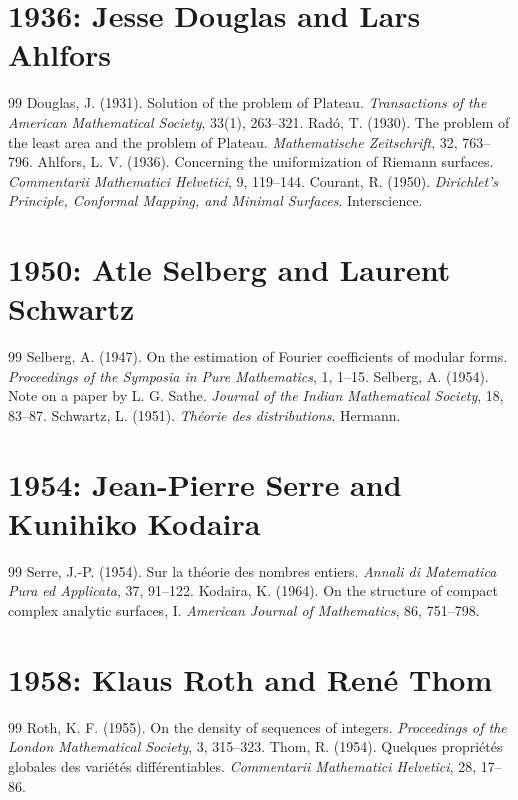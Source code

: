 \documentclass[12pt,a4paper]{book}
\theoremstyle{definition}
\theoremstyle{remark}
\begin{document}
\section*{1936: Jesse Douglas and Lars Ahlfors}
\begin{thebibliography}{99}
 Douglas, J. (1931). Solution of the problem of Plateau. \emph{Transactions of the American Mathematical Society}, 33(1), 263--321.
 Radó, T. (1930). The problem of the least area and the problem of Plateau. \emph{Mathematische Zeitschrift}, 32, 763--796.
 Ahlfors, L. V. (1936). Concerning the uniformization of Riemann surfaces. \emph{Commentarii Mathematici Helvetici}, 9, 119--144.
 Courant, R. (1950). \emph{Dirichlet's Principle, Conformal Mapping, and Minimal Surfaces}. Interscience.
\end{thebibliography}

\section*{1950: Atle Selberg and Laurent Schwartz}
\begin{thebibliography}{99}
 Selberg, A. (1947). On the estimation of Fourier coefficients of modular forms. \emph{Proceedings of the Symposia in Pure Mathematics}, 1, 1--15.
 Selberg, A. (1954). Note on a paper by L. G. Sathe. \emph{Journal of the Indian Mathematical Society}, 18, 83--87.
 Schwartz, L. (1951). \emph{Théorie des distributions}. Hermann.
\end{thebibliography}

\section*{1954: Jean-Pierre Serre and Kunihiko Kodaira}
\begin{thebibliography}{99}
 Serre, J.-P. (1954). Sur la théorie des nombres entiers. \emph{Annali di Matematica Pura ed Applicata}, 37, 91--122.
 Kodaira, K. (1964). On the structure of compact complex analytic surfaces, I. \emph{American Journal of Mathematics}, 86, 751--798.
\end{thebibliography}

\section*{1958: Klaus Roth and René Thom}
\begin{thebibliography}{99}
 Roth, K. F. (1955). On the density of sequences of integers. \emph{Proceedings of the London Mathematical Society}, 3, 315--323.
 Thom, R. (1954). Quelques propriétés globales des variétés différentiables. \emph{Commentarii Mathematici Helvetici}, 28, 17--86.
\end{thebibliography}
\end{document}
